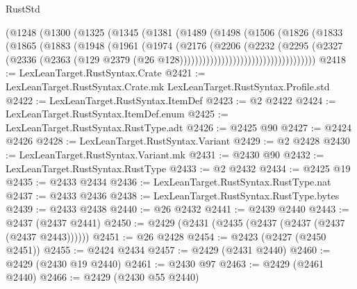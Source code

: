 \begin{lexlean}{RustStd}
\begin{coremodule}
{\begin{coremodule}
{{{{{{{{{{{{{{{{{{{{{{{{{{{{{{{{{{{{{{{                            (@1248
                              (@1300
                                (@1325
                                  (@1345
                                    (@1381
                                      (@1489
                                        (@1498
                                          (@1506
                                            (@1826
                                              (@1833
                                                (@1865
                                                  (@1883
                                                    (@1948
                                                      (@1961
                                                        (@1974
                                                          (@2176
                                                            (@2206
                                                              (@2232
                                                                (@2295
                                                                  (@2327
                                                                    (@2336
                                                                      (@2363
                                                                        (@129
                                                                          @2379
                                                                          (@26
                                                                            @128))))))))))))))))))))))))))))))))))))
@2418 := LexLeanTarget.RustSyntax.Crate
@2421 := LexLeanTarget.RustSyntax.Crate.mk LexLeanTarget.RustSyntax.Profile.std
@2422 := LexLeanTarget.RustSyntax.ItemDef
@2423 := @2 @2422
@2424 := LexLeanTarget.RustSyntax.ItemDef.enum
@2425 := LexLeanTarget.RustSyntax.RustType.adt
@2426 := @2425 @90
@2427 := @2424 @2426
@2428 := LexLeanTarget.RustSyntax.Variant
@2429 := @2 @2428
@2430 := LexLeanTarget.RustSyntax.Variant.mk
@2431 := @2430 @90
@2432 := LexLeanTarget.RustSyntax.RustType
@2433 := @2 @2432
@2434 := @2425 @19
@2435 := @2433 @2434
@2436 := LexLeanTarget.RustSyntax.RustType.nat
@2437 := @2433 @2436
@2438 := LexLeanTarget.RustSyntax.RustType.bytes
@2439 := @2433 @2438
@2440 := @26 @2432
@2441 := @2439 @2440
@2443 := @2437 (@2437 @2441)
@2450 := @2429 (@2431 (@2435 (@2437 (@2437 (@2437 (@2437 @2443))))))
@2451 := @26 @2428
@2454 := @2423 (@2427 (@2450 @2451))
@2455 := @2424 @2434
@2457 := @2429 (@2431 @2440)
@2460 := @2429 (@2430 @19 @2440)
@2461 := @2430 @97
@2463 := @2429 (@2461 @2440)
@2466 := @2429 (@2430 @55 @2440)
}}}}}}}}}}}}}}}}}}}}}}}}}}}}}}}}}}}}}}}
\end{coremodule}}
\end{coremodule}
\end{lexlean}
